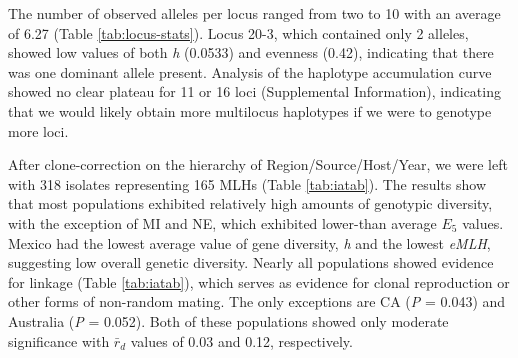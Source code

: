 \documentclass[fleqn,10pt,lineno]{wlpeerj} %
\theoremstyle{definition}
\theoremstyle{definition}
\theoremstyle{definition}
\theoremstyle{remark}
\begin{document}
The number of observed alleles per locus ranged from two to 10 with an
average of 6.27 (Table \ref{tab:locus-stats}). Locus 20-3, which
contained only 2 alleles, showed low values of both \emph{h} (0.0533)
and evenness (0.42), indicating that there was one dominant allele
present. Analysis of the haplotype accumulation curve showed no clear
plateau for 11 or 16 loci (Supplemental Information), indicating that we
would likely obtain more multilocus haplotypes if we were to genotype
more loci.

After clone-correction on the hierarchy of Region/Source/Host/Year, we
were left with 318 isolates representing 165 MLHs (Table
\ref{tab:iatab}). The results show that most populations exhibited
relatively high amounts of genotypic diversity, with the exception of MI
and NE, which exhibited lower-than average \(E_5\) values. Mexico had
the lowest average value of gene diversity, \emph{h} and the lowest
\emph{eMLH}, suggesting low overall genetic diversity. Nearly all
populations showed evidence for linkage (Table \ref{tab:iatab}), which
serves as evidence for clonal reproduction or other forms of non-random
mating. The only exceptions are CA (\emph{P} = 0.043) and Australia
(\emph{P} = 0.052). Both of these populations showed only moderate
significance with \(\bar{r}_d\) values of 0.03 and 0.12, respectively.
\end{document}
